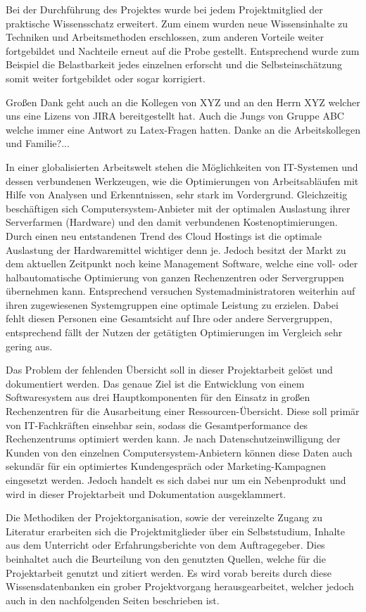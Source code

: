 Bei der Durchführung des Projektes wurde bei jedem Projektmitglied der
praktische Wissensschatz erweitert. Zum einem wurden neue Wissensinhalte zu
Techniken und Arbeitsmethoden erschlossen, zum anderen Vorteile weiter
fortgebildet und Nachteile erneut auf die Probe gestellt. Entsprechend wurde
zum Beispiel die Belastbarkeit jedes einzelnen erforscht und die
Selbsteinschätzung somit weiter fortgebildet oder sogar korrigiert.

Großen Dank geht auch an die Kollegen von XYZ und an den Herrn XYZ welcher
uns eine Lizens von JIRA bereitgestellt hat. Auch die Jungs von Gruppe ABC
welche immer eine Antwort zu Latex-Fragen hatten. Danke an die Arbeitskollegen
und Familie?...

In einer globalisierten Arbeitswelt stehen die Möglichkeiten von IT-Systemen
und dessen verbundenen Werkzeugen, wie die Optimierungen von Arbeitsabläufen
mit Hilfe von Analysen und Erkenntnissen, sehr stark im Vordergrund.
Gleichzeitig beschäftigen sich Computersystem-Anbieter mit der optimalen
Auslastung ihrer Serverfarmen (Hardware) und den damit verbundenen
Kostenoptimierungen. Durch einen neu entstandenen Trend des Cloud Hostings
ist die optimale Auslastung der Hardwaremittel wichtiger denn je. Jedoch
besitzt der Markt zu dem aktuellen Zeitpunkt noch keine Management Software,
welche eine voll- oder halbautomatische Optimierung von ganzen Rechenzentren
oder Servergruppen übernehmen kann. Entsprechend versuchen
Systemadministratoren weiterhin auf ihren zugewiesenen Systemgruppen eine
optimale Leistung zu erzielen. Dabei fehlt diesen Personen eine Gesamtsicht
auf Ihre oder andere Servergruppen, entsprechend fällt der Nutzen der
getätigten Optimierungen im Vergleich sehr gering aus.

Das Problem der fehlenden Übersicht soll in dieser Projektarbeit gelöst
und dokumentiert werden. Das genaue Ziel ist die Entwicklung von einem
Softwaresystem aus drei Hauptkomponenten für den Einsatz in großen
Rechenzentren für die Ausarbeitung einer Ressourcen-Übersicht. Diese
soll primär von IT-Fachkräften einsehbar sein, sodass die Gesamtperformance
des Rechenzentrums optimiert werden kann. Je nach Datenschutzeinwilligung
der Kunden von den einzelnen Computersystem-Anbietern können diese Daten auch
sekundär für ein optimiertes Kundengespräch oder Marketing-Kampagnen eingesetzt
werden. Jedoch handelt es sich dabei nur um ein Nebenprodukt und wird in dieser
Projektarbeit und Dokumentation ausgeklammert.

Die Methodiken der Projektorganisation, sowie der vereinzelte Zugang zu
Literatur erarbeiten sich die Projektmitglieder über ein Selbststudium,
Inhalte aus dem Unterricht oder Erfahrungsberichte von dem Auftragegeber.
Dies beinhaltet auch die Beurteilung von den genutzten Quellen, welche
für die Projektarbeit genutzt und zitiert werden. Es wird vorab
bereits durch diese Wissensdatenbanken ein grober Projektvorgang
herausgearbeitet, welcher jedoch auch in den nachfolgenden Seiten
beschrieben ist.
\nl%

